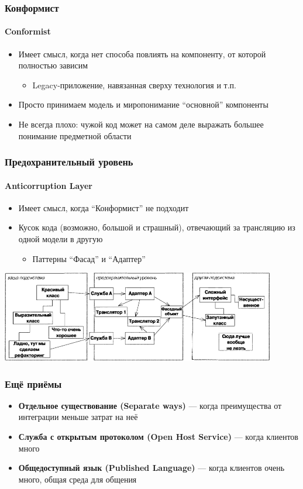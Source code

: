 \documentclass[xetex,mathserif,serif]{beamer}
\begin{document}
	\begin{frame}
		\frametitle{Конформист}
		\framesubtitle{Conformist}
		\begin{itemize}
			\item Имеет смысл, когда нет способа повлиять на компоненту, от которой полностью зависим
			\begin{itemize}
				\item Legacy-приложение, навязанная сверху технология и т.п.
			\end{itemize}
			\item Просто принимаем модель и миропонимание ``основной'' компоненты
			\item Не всегда плохо: чужой код может на самом деле выражать большее понимание предметной области
		\end{itemize}
	\end{frame}

	\begin{frame}
		\frametitle{Предохранительный уровень}
		\framesubtitle{Anticorruption Layer}
		\begin{itemize}
			\item Имеет смысл, когда ``Конформист'' не подходит
			\item Кусок кода (возможно, большой и страшный), отвечающий за трансляцию из одной модели в другую
			\begin{itemize}
				\item Паттерны ``Фасад'' и ``Адаптер'' 
			\end{itemize}
		\end{itemize}
		\begin{center}
			\includegraphics[width=0.9\textwidth]{anticorruptionLayer.png}
		\end{center}
	\end{frame}

	\begin{frame}
		\frametitle{Ещё приёмы}
		\begin{itemize}
			\item \textbf{Отдельное существование (Separate ways)} --- когда преимущества от интеграции меньше затрат на неё
			\item \textbf{Служба с открытым протоколом (Open Host Service)} --- когда клиентов много
			\item \textbf{Общедоступный язык (Published Language)} --- когда клиентов очень много, общая среда для общения
		\end{itemize}
	\end{frame}
\end{document}
